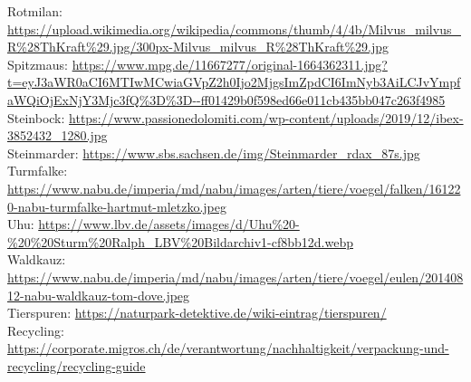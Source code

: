 Rotmilan: \url{https://upload.wikimedia.org/wikipedia/commons/thumb/4/4b/Milvus_milvus_R%28ThKraft%29.jpg/300px-Milvus_milvus_R%28ThKraft%29.jpg} \\
Spitzmaus: \url{https://www.mpg.de/11667277/original-1664362311.jpg?t=eyJ3aWR0aCI6MTIwMCwiaGVpZ2h0Ijo2MjgsImZpdCI6ImNyb3AiLCJvYmpfaWQiOjExNjY3Mjc3fQ%3D%3D--ff01429b0f598ed66e011cb435bb047c263f4985} \\
Steinbock: \url{https://www.passionedolomiti.com/wp-content/uploads/2019/12/ibex-3852432_1280.jpg} \\
Steinmarder: \url{https://www.sbs.sachsen.de/img/Steinmarder_rdax_87s.jpg} \\
Turmfalke: \url{https://www.nabu.de/imperia/md/nabu/images/arten/tiere/voegel/falken/161220-nabu-turmfalke-hartmut-mletzko.jpeg} \\
Uhu: \url{https://www.lbv.de/assets/images/d/Uhu%20-%20%20Sturm%20Ralph_LBV%20Bildarchiv1-cf8bb12d.webp} \\
Waldkauz: \url{https://www.nabu.de/imperia/md/nabu/images/arten/tiere/voegel/eulen/20140812-nabu-waldkauz-tom-dove.jpeg} \\
Tierspuren: \url{https://naturpark-detektive.de/wiki-eintrag/tierspuren/} \\
Recycling: \url{https://corporate.migros.ch/de/verantwortung/nachhaltigkeit/verpackung-und-recycling/recycling-guide} \\